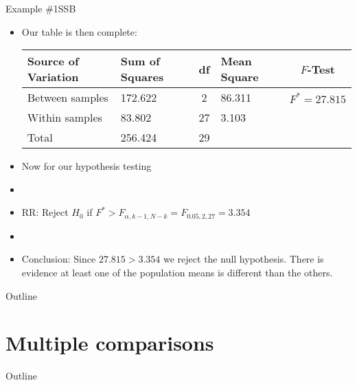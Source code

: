 \documentclass[xcolor=dvipsnames]{beamer}
\begin{document}
\begin{frame}{Example \#1}{SSB}
	\begin{itemize}
		\item Our table is then complete:
		\vspace{2mm}
		\begin{center}
			{\scriptsize
				\begin{tabular}{lp{1.2cm}cp{2.5cm}c}
					\hline 
					\textbf{Source of Variation} & \textbf{Sum of Squares} & \textbf{df} & \textbf{Mean Square} & $F$-\textbf{Test} \\ \hline 
					Between samples & 172.622 & 2 & 86.311 & $F^*=27.815$ \\
					Within samples & 83.802 & 27 &  3.103 & \\
					Total & 256.424 & 29 & & \\ \hline
			\end{tabular}}
		\end{center}
	\vspace{2mm}
	\item Now for our hypothesis testing
	\item[]
	\item RR: Reject $H_0$ if $F^* > F_{\alpha, k-1, N-k} = F_{0.05, 2, 27} =3.354 $
	\item[]
	\item Conclusion: Since $27.815 > 3.354$ we reject the null hypothesis. There is evidence at least one of the population means is different than the others. 
	\end{itemize}
\end{frame}

\begin{frame}{Outline}
\tableofcontents[currentsection,subsectionstyle=show/shaded/hide]
\end{frame}

\section{Multiple comparisons}

\begin{frame}{Outline}
\tableofcontents[currentsection,subsectionstyle=show/shaded/hide]
\end{frame}
\end{document}
